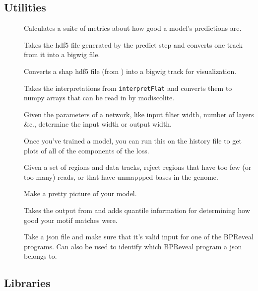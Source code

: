 \documentclass{article}
\begin{document}
\subsection{Utilities}

\begin{description}
    \item [] Calculates a suite of metrics about how good a
        model's predictions are.
    \item [] Takes the hdf5 file generated by the
        predict step and converts one track from it into a bigwig
        file.\label{prog:predictToBigwig}
    \item [] Converts a shap hdf5 file (from
        ) into a bigwig track for
        visualization.\label{prog:shapToBigwig}
    \item [] Takes the interpretations from
        \texttt{interpretFlat} and converts them to numpy arrays that can be
        read in by modiscolite.\label{prog:shapToNumpy}
    \item [] Given the parameters of a network, like input
        filter width, number of layers \&c., determine the input width or
        output width. \label{prog:lengthCalc}
    \item [] Once you've trained a model, you can run
        this on the history file to get plots of all of the components of the
        loss. \label{prog:makeLossPlots}
    \item [] Given a set of regions and data tracks, reject
        regions that have too few (or too many) reads, or that have unmappped
        bases in the genome.
    \item [] Make a pretty picture of your
        model.\label{prog:showModel}
    \item [] Takes the output from
         and adds quantile information for determining how
        good your motif matches were.
    \item [] Take a json file and make sure that it's valid
        input for one of the BPReveal programs. Can also be used to identify
        which BPReveal program a json belongs to.\label{prog:checkJson}
\end{description}

\subsection{Libraries}
\end{document}
